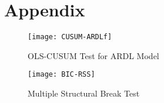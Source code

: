 \documentclass[12pt]{article} %
\begin{document}
\newpage






\newpage



\section*{Appendix}



	\begin{figure}[hpb] %
		\centering
		\caption{OLS-CUSUM Test for ARDL Model}
		\texttt{[image: CUSUM-ARDLf]}
		\label{figure:third}
	\end{figure}

	\begin{figure}[hpb]
		\centering
		\caption{Multiple Structural Break Test}
		\texttt{[image: BIC-RSS]}
		\label{figure:fourth}
	\end{figure}
\end{document}
